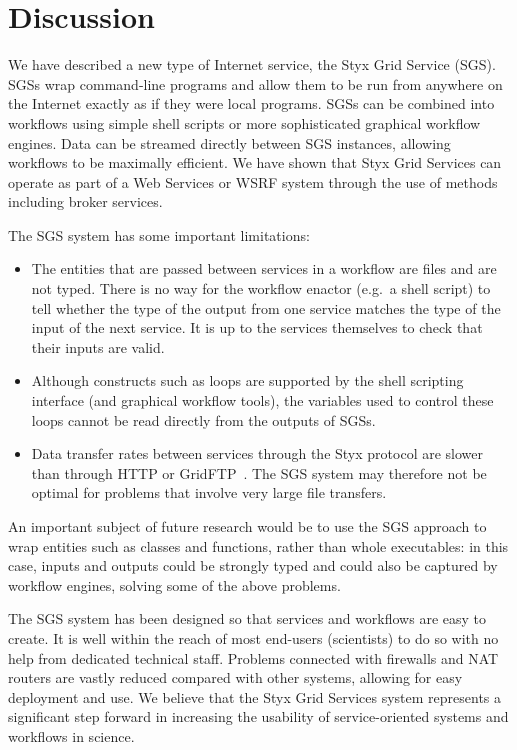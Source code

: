 \documentclass[a4paper]{article}
\begin{document}
\section{Discussion}

We have described a new type of Internet service, the Styx Grid Service (SGS).  SGSs wrap command-line programs and allow them to be run from anywhere on the Internet exactly as if they were local programs.  SGSs can be combined into workflows using simple shell scripts or more sophisticated graphical workflow engines.  Data can be streamed directly between SGS instances, allowing workflows to be maximally efficient.  We have shown that Styx Grid Services can operate as part of a Web Services or WSRF system through the use of methods including broker services.

The SGS system has some important limitations:

\begin{itemize}
	\item The entities that are passed between services in a workflow are files and are not typed.  There is no way for the workflow enactor (e.g.\ a shell script) to tell whether the type of the output from one service matches the type of the input of the next service.  It is up to the services themselves to check that their inputs are valid.
	\item Although constructs such as loops are supported by the shell scripting interface (and graphical workflow tools), the variables used to control these loops cannot be read directly from the outputs of SGSs.
	\item Data transfer rates between services through the Styx protocol are slower than through HTTP or GridFTP~\cite{blower:2005}.  The SGS system may therefore not be optimal for problems that involve very large file transfers.
\end{itemize}

An important subject of future research would be to use the SGS approach to wrap entities such as classes and functions, rather than whole executables: in this case, inputs and outputs could be strongly typed and could also be captured by workflow engines, solving some of the above problems.

The SGS system has been designed so that services and workflows are easy to create.  It is well within the reach of most end-users (scientists) to do so with no help from dedicated technical staff.  Problems connected with firewalls and NAT routers are vastly reduced compared with other systems, allowing for easy deployment and use.  We believe that the Styx Grid Services system represents a significant step forward in increasing the usability of service-oriented systems and workflows in science.
%
\end{document}
